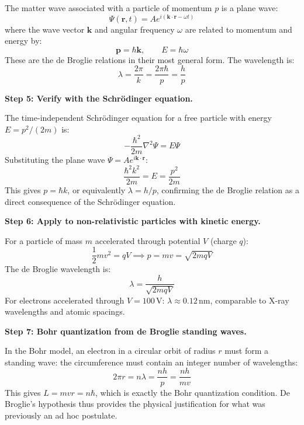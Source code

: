 The matter wave associated with a particle of momentum $p$ is a plane wave:
\begin{equation}
\Psi(\mathbf{r},t) = Ae^{i(\mathbf{k}\cdot\mathbf{r} - \omega t)}
\end{equation}
where the wave vector $\mathbf{k}$ and angular frequency $\omega$ are related to momentum and energy by:
\begin{equation}
\mathbf{p} = \hbar\mathbf{k}, \qquad E = \hbar\omega
\end{equation}
These are the de Broglie relations in their most general form. The wavelength is:
\begin{equation}
\lambda = \frac{2\pi}{k} = \frac{2\pi\hbar}{p} = \frac{h}{p}
\end{equation}

\textbf{Step 5: Verify with the Schrödinger equation.}

The time-independent Schrödinger equation for a free particle with energy $E = p^2/(2m)$ is:
\begin{equation}
-\frac{\hbar^2}{2m}\nabla^2\Psi = E\Psi
\end{equation}
Substituting the plane wave $\Psi = Ae^{i\mathbf{k}\cdot\mathbf{r}}$:
\begin{equation}
\frac{\hbar^2 k^2}{2m} = E = \frac{p^2}{2m}
\end{equation}
This gives $p = \hbar k$, or equivalently $\lambda = h/p$, confirming the de Broglie relation as a direct consequence of the Schrödinger equation.

\textbf{Step 6: Apply to non-relativistic particles with kinetic energy.}

For a particle of mass $m$ accelerated through potential $V$ (charge $q$):
\begin{equation}
\frac{1}{2}mv^2 = qV \implies p = mv = \sqrt{2mqV}
\end{equation}
The de Broglie wavelength is:
\begin{equation}
\lambda = \frac{h}{\sqrt{2mqV}}
\end{equation}
For electrons accelerated through $V = 100\,\text{V}$: $\lambda \approx 0.12\,\text{nm}$, comparable to X-ray wavelengths and atomic spacings.

\textbf{Step 7: Bohr quantization from de Broglie standing waves.}

In the Bohr model, an electron in a circular orbit of radius $r$ must form a standing wave: the circumference must contain an integer number of wavelengths:
\begin{equation}
2\pi r = n\lambda = \frac{nh}{p} = \frac{nh}{mv}
\end{equation}
This gives $L = mvr = n\hbar$, which is exactly the Bohr quantization condition. De Broglie's hypothesis thus provides the physical justification for what was previously an ad hoc postulate.

